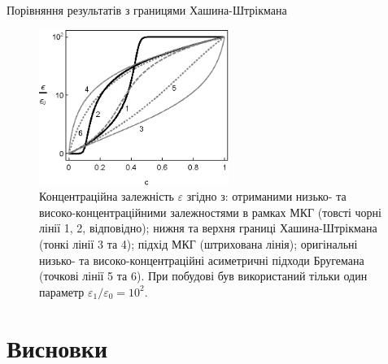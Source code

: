 \documentclass[10pt]{beamer}
\begin{document}
\begin{frame}{Порівняння результатів з границями Хашина-Штрікмана}

\begin{figure}[tb]
    \centering
    \includegraphics[width=0.55\textwidth]{images/hanai-fig2.eps}
    \caption{\label{fig:HSbounds}
    Концентраційна залежність $\varepsilon$ згідно з: отриманими низько- та високо-концентраційними залежностями в рамках МКГ (товсті чорні лінії 1, 2, відповідно); нижня та верхня границі Хашина-Штрікмана (тонкі лінії 3 та 4); підхід МКГ (штрихована лінія); оригінальні низько- та високо-концентраційні асиметричні підходи Бругемана (точкові лінії 5 та 6). При побудові був використаний тільки один параметр $\varepsilon_1/\varepsilon_0 = 10^2$.}
\end{figure}

\end{frame}


\section{Висновки}%
\end{document}
